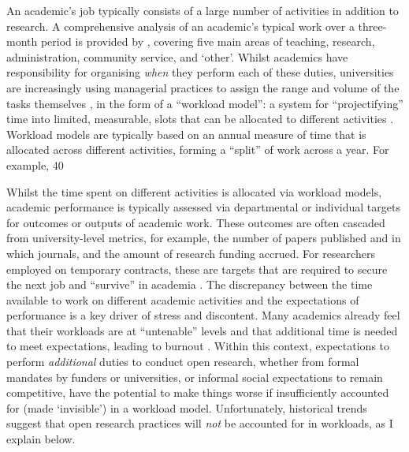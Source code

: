 \documentclass[meta, authordate]{jote-new-article}
\begin{document}
An academic’s job typically consists of a large number of activities in addition to research. A comprehensive analysis of an academic’s typical work over a three-month period is provided by \textcite{Miller2019}, covering five main areas of teaching, research, administration, community service, and ‘other’. Whilst academics have responsibility for organising \emph{when} they perform each of these duties, universities are increasingly using managerial practices to assign the range and volume of the tasks themselves \parencites{Kenny2022}, in the form of a “workload model”: a system for “projectifying” time into limited, measurable, slots that can be allocated to different activities \parencites{Dollinger2020}. Workload models are typically based on an annual measure of time that is allocated across different activities, forming a “split” of work across a year. For example, 40%



Whilst the time spent on different activities is allocated via workload models, academic performance is typically assessed via departmental or individual targets for outcomes or outputs of academic work. These outcomes are often cascaded from university-level metrics, for example, the number of papers published and in which journals, and the amount of research funding accrued. For researchers employed on temporary contracts, these are targets that are required to secure the next job and “survive” in academia \parencites{Anderson2007}. The discrepancy between the time available to work on different academic activities and the expectations of performance is a key driver of stress and discontent. Many academics already feel that their workloads are at “untenable” levels and that additional time is needed to meet expectations, leading to burnout \parencites{Beatson2021}. Within this context, expectations to perform \emph{additional} duties to conduct open research, whether from formal mandates by funders or universities, or informal social expectations to remain competitive, have the potential to make things worse if insufficiently accounted for (made ‘invisible’) in a workload model. Unfortunately, historical trends suggest that open research practices will \emph{not} be accounted for in workloads, as I explain below.
\end{document}
